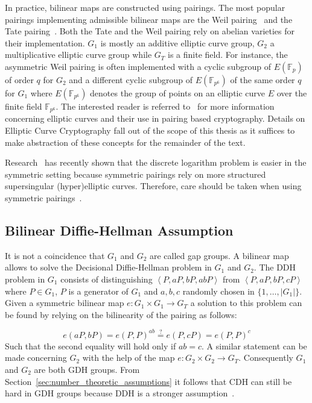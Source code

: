 In practice, bilinear maps are constructed using pairings. The most popular pairings implementing admissible bilinear maps are the Weil pairing~\cite{art:BonehF01} and the Tate pairing~\cite{art:FreyMR99}. Both the Tate and the Weil pairing rely on abelian varieties for their implementation. $G_1$ is mostly an additive elliptic curve group, $G_2$ a multiplicative elliptic curve group while $G_T$ is a finite field. For instance, the asymmetric Weil pairing is often implemented with a cyclic subgroup of $E\left( \mathbb{F}_p \right)$ of order $q$ for $G_2$ and a different cyclic subgroup of $E \left( \mathbb{F}_{p^6} \right)$ of the same order $q$ for $G_1$ where $E\left( \mathbb{F}_{p^6} \right)$ denotes the group of points on an elliptic curve $E$ over the finite field $\mathbb{F}_{p^6}$. The interested reader is referred to~\cite{thesis:Maas04} for more information concerning elliptic curves and their use in pairing based cryptography. Details on Elliptic Curve Cryptography fall out of the scope of this thesis as it suffices to make abstraction of these concepts for the remainder of the text.

Research~\cite{art:BarbulescuGJT14,art:Joux13,art:AdjMOR13} has recently shown that the discrete logarithm problem is easier in the symmetric setting because symmetric pairings rely on more structured supersingular (hyper)elliptic curves. Therefore, care should be taken when using symmetric pairings~\cite{art:ZhangW13}.

\subsection{Bilinear Diffie-Hellman Assumption}
It is not a coincidence that $G_1$ and $G_2$ are called gap groups. A bilinear map allows to solve the Decisional Diffie-Hellman problem in $G_1$ and $G_2$. The DDH problem in $G_1$ consists of distinguishing $\left< P, aP, bP, abP \right>$ from $\left< P, aP, bP, cP \right>$ where $P \in G_1$, $P$ is a generator of $G_1$ and $a, b, c$ randomly chosen in $\{1, \ldots, \vert G_1 \vert \}$. Given a symmetric bilinear map $e: G_1 \times G_1 \rightarrow G_T$ a solution to this problem can be found by relying on the bilinearity of the pairing as follows:

\begin{equation*}
 e \left( aP, bP \right) = e \left( P, P \right)^{ab} \stackrel{?}{=} e \left( P, cP \right) = e \left( P, P\right)^c
\end{equation*}
Such that the second equality will hold only if $ab = c$. A similar statement can be made concerning $G_2$ with the help of the map $e: G_2 \times G_2 \rightarrow G_T$. Consequently $G_1$ and $G_2$ are both GDH groups. From Section~\ref{sec:number_theoretic_assumptions} it follows that CDH can still be hard in GDH groups because DDH is a stronger assumption~\cite{art:BonehF01}.

